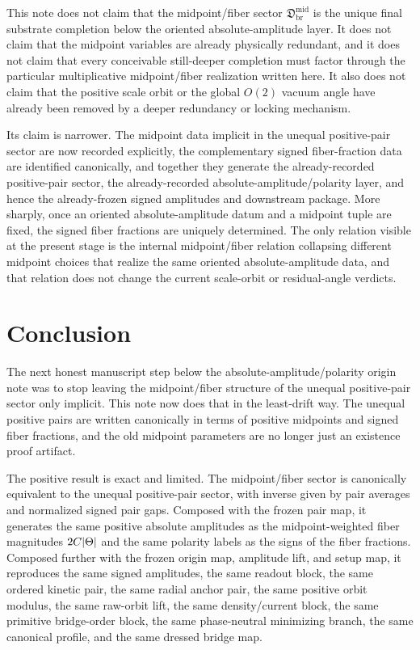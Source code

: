 \documentclass[11pt]{article}
\newcommand{\MidFiberSector}{\mathfrak D_{\mathrm{br}}^{\mathrm{mid}}}
\begin{document}
This note does not claim that the midpoint/fiber sector \(\MidFiberSector\) is the unique final substrate completion below the oriented absolute-amplitude layer. It does not claim that the midpoint variables are already physically redundant, and it does not claim that every conceivable still-deeper completion must factor through the particular multiplicative midpoint/fiber realization written here. It also does not claim that the positive scale orbit or the global \(O(2)\) vacuum angle have already been removed by a deeper redundancy or locking mechanism.

Its claim is narrower. The midpoint data implicit in the unequal positive-pair sector are now recorded explicitly, the complementary signed fiber-fraction data are identified canonically, and together they generate the already-recorded positive-pair sector, the already-recorded absolute-amplitude/polarity layer, and hence the already-frozen signed amplitudes and downstream package. More sharply, once an oriented absolute-amplitude datum and a midpoint tuple are fixed, the signed fiber fractions are uniquely determined. The only relation visible at the present stage is the internal midpoint/fiber relation collapsing different midpoint choices that realize the same oriented absolute-amplitude data, and that relation does not change the current scale-orbit or residual-angle verdicts.

\section{Conclusion}

The next honest manuscript step below the absolute-amplitude/polarity origin note was to stop leaving the midpoint/fiber structure of the unequal positive-pair sector only implicit. This note now does that in the least-drift way. The unequal positive pairs are written canonically in terms of positive midpoints and signed fiber fractions, and the old midpoint parameters are no longer just an existence proof artifact.

The positive result is exact and limited. The midpoint/fiber sector is canonically equivalent to the unequal positive-pair sector, with inverse given by pair averages and normalized signed pair gaps. Composed with the frozen pair map, it generates the same positive absolute amplitudes as the midpoint-weighted fiber magnitudes \(2C\abs{\Theta}\) and the same polarity labels as the signs of the fiber fractions. Composed further with the frozen origin map, amplitude lift, and setup map, it reproduces the same signed amplitudes, the same readout block, the same ordered kinetic pair, the same radial anchor pair, the same positive orbit modulus, the same raw-orbit lift, the same density/current block, the same primitive bridge-order block, the same phase-neutral minimizing branch, the same canonical profile, and the same dressed bridge map.
\end{document}
